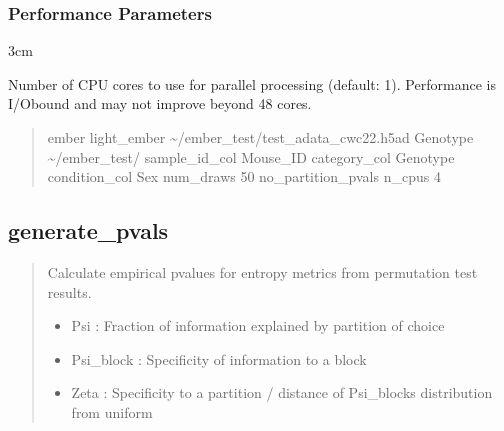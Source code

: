 \documentclass[letterpaper,10pt,english]{sphinxmanual}
\begin{document}
\subsubsection{Performance Parameters}
\label{\detokenize{cli:performance-parameters}}\begin{optionlist}{3cm}
\item [\sphinxhyphen{}\sphinxhyphen{}n\_cpus]  
\sphinxAtStartPar
Number of CPU cores to use for parallel processing (default: 1). Performance is I/O\sphinxhyphen{}bound and may not improve beyond 4\textendash{}8 cores.
\end{optionlist}
\begin{quote}
\begin{description}
\sphinxAtStartPar
ember light\_ember \textasciitilde{}/ember\_test/test\_adata\_cwc22.h5ad Genotype \textasciitilde{}/ember\_test/ \textendash{}sample\_id\_col Mouse\_ID \textendash{}category\_col Genotype \textendash{}condition\_col Sex \textendash{}num\_draws 50 \textendash{}no\_partition\_pvals \textendash{}n\_cpus 4

\end{description}
\end{quote}


\subsection{generate\_pvals}
\label{\detokenize{cli:generate_pvals}}\begin{quote}

\sphinxAtStartPar
Calculate empirical p\sphinxhyphen{}values for entropy metrics from permutation test results.
\begin{description}
\begin{itemize}
\item {} 
\sphinxAtStartPar
Psi : Fraction of information explained by partition of choice

\item {} 
\sphinxAtStartPar
Psi\_block : Specificity of information to a block

\item {} 
\sphinxAtStartPar
Zeta : Specificity to a partition / distance of Psi\_blocks distribution from uniform

\end{itemize}

\end{description}
\end{quote}
\end{document}
